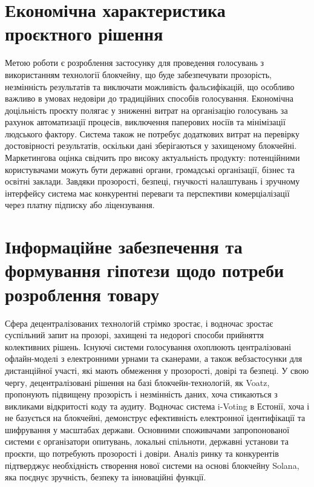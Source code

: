 \documentclass[14pt]{extreport}
\begin{document}
  \section{Економічна характеристика проєктного рішення}
  
  Метою роботи є розроблення застосунку для проведення голосувань з використанням технології блокчейну, що буде забезпечувати прозорість, незмінність результатів та виключати можливість фальсифікацій, що особливо важливо в умовах недовіри до традиційних способів голосування. Економічна доцільність проєкту полягає у зниженні витрат на організацію голосувань за рахунок автоматизації процесів, виключення паперових носіїв та мінімізації людського фактору. Система також не потребує додаткових витрат на перевірку достовірності результатів, оскільки дані зберігаються у захищеному блокчейні. Маркетингова оцінка свідчить про високу актуальність продукту: потенційними користувачами можуть бути державні органи, громадські організації, бізнес та освітні заклади. Завдяки прозорості, безпеці, гнучкості налаштувань і зручному інтерфейсу система має конкурентні переваги та перспективи комерціалізації через платну підписку або ліцензування.
  
  \section{Інформаційне забезпечення та формування гіпотези щодо потреби розроблення товару}
  
  Сфера децентралізованих технологій стрімко зростає, і водночас зростає суспільний запит на прозорі, захищені та недорогі способи прийняття колективних рішень. Існуючі системи голосування охоплюють централізовані офлайн-моделі з електронними урнами та сканерами, а також вебзастосунки для дистанційної участі, які мають обмеження у прозорості, довірі та безпеці. У свою чергу, децентралізовані рішення на базі блокчейн-технологій, як Voatz, пропонують підвищену прозорість і незмінність даних, хоча стикаються з викликами відкритості коду та аудиту. Водночас система i-Voting в Естонії, хоча і не базується на блокчейні, демонструє ефективність електронної ідентифікації та шифрування у масштабах держави. Основними споживачами запропонованої системи є організатори опитувань, локальні спільноти, державні установи та проєкти, що потребують прозорості і довіри. Аналіз ринку та конкурентів підтверджує необхідність створення нової системи на основі блокчейну Solana, яка поєднує зручність, безпеку та інноваційні функції.
  
\end{document}
